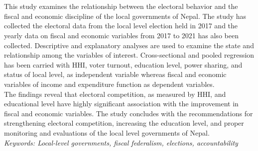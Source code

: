 \section*{}
\vspace{-10mm}
This study examines the relationship between the electoral behavior and the fiscal and economic discipline of the local governments of Nepal. The study has collected the electoral data from the local level election held in 2017 and the yearly data on fiscal and economic variables from 2017 to 2021 has also been collected. Descriptive and explanatory analyses are used to examine the state and relationship among the variables of interest. Cross-sectional and pooled regression has been carried with HHI, voter turnout, education level, power sharing, and status of local level, as independent variable whereas fiscal and economic variables of income and expenditure function as dependent variables.\\
The findings reveal that electoral competition, as measured by HHI, and educational level have highly significant association with the improvement in fiscal and economic variables. The study concludes with the recommendations for strengthening electoral competition, increasing the education level, and proper monitoring and evaluations of the local level governments of Nepal.\\
\textit{Keywords: Local-level governments, fiscal federalism, elections, accountability}
